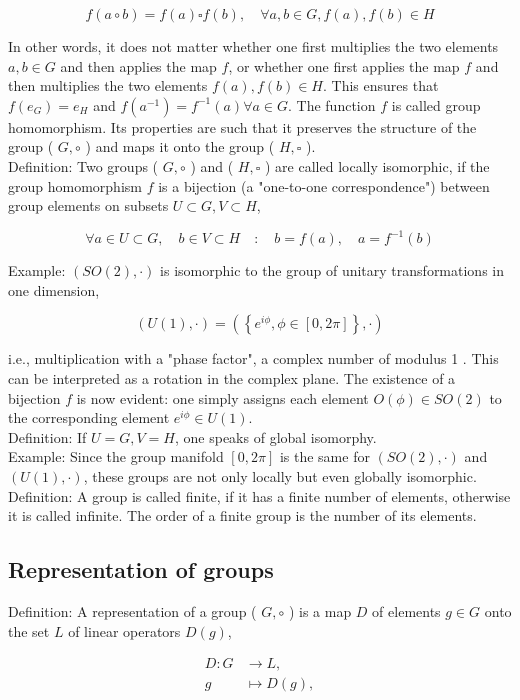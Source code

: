 \documentclass[10pt, letterpaper]{article}
\begin{document}
$$
f(a \circ b)=f(a) \square f(b), \quad \forall a, b \in G, f(a), f(b) \in H
$$

In other words, it does not matter whether one first multiplies the two elements $a, b \in G$ and then applies the map $f$, or whether one first applies the map $f$ and then multiplies the two elements $f(a), f(b) \in H$. This ensures that $f\left(e_{G}\right)=e_{H}$ and $f\left(a^{-1}\right)=f^{-1}(a) \forall a \in G$. The function $f$ is called group homomorphism. Its properties are such that it preserves the structure of the group ( $G, \circ$ ) and maps it onto the group ( $H, \square$ ).\\
Definition: Two groups ( $G, \circ$ ) and ( $H, \square$ ) are called locally isomorphic, if the group homomorphism $f$ is a bijection (a "one-to-one correspondence") between group elements on subsets $U \subset G, V \subset H$,

$$
\forall a \in U \subset G, \quad b \in V \subset H \quad: \quad b=f(a), \quad a=f^{-1}(b)
$$

Example: $(S O(2), \cdot)$ is isomorphic to the group of unitary transformations in one dimension,

$$
(U(1), \cdot)=\left(\left\{e^{i \phi}, \phi \in[0,2 \pi]\right\}, \cdot\right)
$$

i.e., multiplication with a "phase factor", a complex number of modulus 1 . This can be interpreted as a rotation in the complex plane. The existence of a bijection $f$ is now evident: one simply assigns each element $O(\phi) \in S O(2)$ to the corresponding element $e^{i \phi} \in U(1)$.\\
Definition: If $U=G, V=H$, one speaks of global isomorphy.\\
Example: Since the group manifold $[0,2 \pi]$ is the same for $(S O(2), \cdot)$ and $(U(1), \cdot)$, these groups are not only locally but even globally isomorphic.\\
Definition: A group is called finite, if it has a finite number of elements, otherwise it is called infinite. The order of a finite group is the number of its elements.

\subsection{Representation of groups}
Definition: A representation of a group ( $G, \circ$ ) is a map $D$ of elements $g \in G$ onto the set $L$ of linear operators $D(g)$,

$$
\begin{aligned}
D: G & \rightarrow L, \\
g & \mapsto D(g),
\end{aligned}
$$
\end{document}
